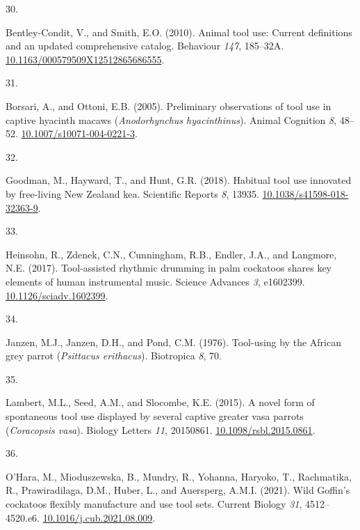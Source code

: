 \documentclass[
  man, donotrepeattitle,floatsintext]{apa6}
\newlength{\cslhangindent}
\newlength{\csllabelwidth}
\newlength{\cslentryspacingunit} %
\newenvironment{CSLReferences}[2] %
 {%
  \setlength{\parindent}{0pt}
  \ifodd #1
  \let\oldpar\par
  \def\par{\hangindent=\cslhangindent\oldpar}
  \fi
  \setlength{\parskip}{#2\cslentryspacingunit}
 }%
 {}
\newcommand{\CSLLeftMargin}[1]{\parbox[t]{\csllabelwidth}{#1}}
\newcommand{\CSLRightInline}[1]{\parbox[t]{\linewidth - \csllabelwidth}{#1}\break}
\begin{document}
\begin{CSLReferences}{0}{0}
\leavevmode{}%
\CSLLeftMargin{30. }%
\CSLRightInline{Bentley-Condit, V., and Smith, E.O. (2010). Animal tool use: Current definitions and an updated comprehensive catalog. Behaviour \emph{147}, 185--32A. \href{https://doi.org/10.1163/000579509X12512865686555}{10.1163/000579509X12512865686555}.}

\leavevmode{}%
\CSLLeftMargin{31. }%
\CSLRightInline{Borsari, A., and Ottoni, E.B. (2005). Preliminary observations of tool use in captive hyacinth macaws (\emph{{A}nodorhynchus hyacinthinus}). Animal Cognition \emph{8}, 48--52. \href{https://doi.org/10.1007/s10071-004-0221-3}{10.1007/s10071-004-0221-3}.}

\leavevmode{}%
\CSLLeftMargin{32. }%
\CSLRightInline{Goodman, M., Hayward, T., and Hunt, G.R. (2018). Habitual tool use innovated by free-living {N}ew {Z}ealand kea. Scientific Reports \emph{8}, 13935. \href{https://doi.org/10.1038/s41598-018-32363-9}{10.1038/s41598-018-32363-9}.}

\leavevmode{}%
\CSLLeftMargin{33. }%
\CSLRightInline{Heinsohn, R., Zdenek, C.N., Cunningham, R.B., Endler, J.A., and Langmore, N.E. (2017). Tool-assisted rhythmic drumming in palm cockatoos shares key elements of human instrumental music. Science Advances \emph{3}, e1602399. \href{https://doi.org/10.1126/sciadv.1602399}{10.1126/sciadv.1602399}.}

\leavevmode{}%
\CSLLeftMargin{34. }%
\CSLRightInline{Janzen, M.J., Janzen, D.H., and Pond, C.M. (1976). Tool-using by the {A}frican grey parrot (\emph{{P}sittacus erithacus}). Biotropica \emph{8}, 70.}

\leavevmode{}%
\CSLLeftMargin{35. }%
\CSLRightInline{Lambert, M.L., Seed, A.M., and Slocombe, K.E. (2015). A novel form of spontaneous tool use displayed by several captive greater vasa parrots (\emph{{C}oracopsis vasa}). Biology Letters \emph{11}, 20150861. \href{https://doi.org/10.1098/rsbl.2015.0861}{10.1098/rsbl.2015.0861}.}

\leavevmode{}%
\CSLLeftMargin{36. }%
\CSLRightInline{O'Hara, M., Mioduszewska, B., Mundry, R., Yohanna, Haryoko, T., Rachmatika, R., Prawiradilaga, D.M., Huber, L., and Auersperg, A.M.I. (2021). Wild {G}offin's cockatoos flexibly manufacture and use tool sets. Current Biology \emph{31}, 4512--4520.e6. \href{https://doi.org/10.1016/j.cub.2021.08.009}{10.1016/j.cub.2021.08.009}.}


\end{CSLReferences}
\end{document}
